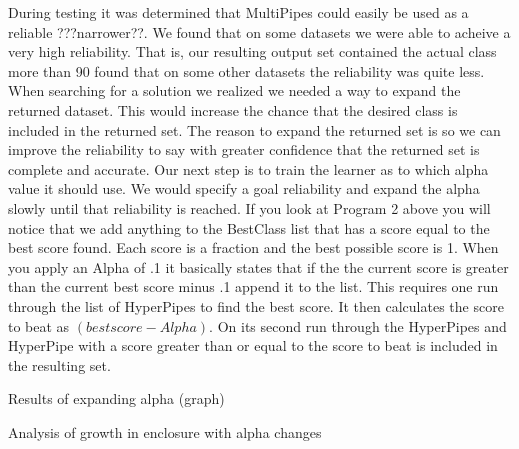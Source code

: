 During testing it was determined that MultiPipes could easily be used 
as a reliable ???narrower??. We found that on some datasets we were 
able to acheive a very high reliability. That is, our resulting output 
set contained the actual class more than 90%
found that on some other datasets the reliability was quite less. 
When searching for a solution we realized we needed a way to expand 
the returned dataset. This would increase the chance that the desired 
class is included in the returned set. The reason to expand the 
returned set is so we can improve the reliability to say with greater
confidence that the returned set is complete and accurate. Our next 
step is to train the learner as to which alpha value it should use. 
We would specify a goal reliability and expand the alpha slowly until 
that reliability is reached. If you look at Program 2 above you will 
notice that we add anything to the BestClass list that has a score 
equal to the best score found. Each score is a fraction and the best 
possible score is 1. When you apply an Alpha of .1 it basically 
states that if the the current score is greater than the current best 
score minus .1 append it to the list. This requires one run through the 
list of HyperPipes to find the best score. It then calculates the score 
to beat as \begin{math}(best score - Alpha)\end{math}. On its second run through the 
HyperPipes and HyperPipe with a score greater than or equal to the 
score to beat is included in the resulting set. 

Results of expanding alpha (graph)

Analysis of growth in enclosure with alpha changes

